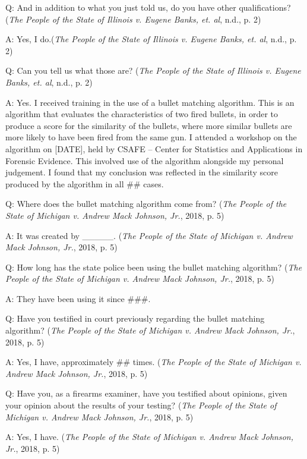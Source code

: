 \documentclass[print]{nuthesis}
\begin{document}
Q: And in addition to what you just told us, do you have other qualifications? (\emph{The {People} of the {State} of {Illinois} v. Eugene {Banks}, et. al}, n.d., p. 2)

A: Yes, I do.(\emph{The {People} of the {State} of {Illinois} v. Eugene {Banks}, et. al}, n.d., p. 2)

Q: Can you tell us what those are? (\emph{The {People} of the {State} of {Illinois} v. Eugene {Banks}, et. al}, n.d., p. 2)

A: Yes. I received training in the use of a bullet matching algorithm.
This is an algorithm that evaluates the characteristics of two fired bullets, in order to produce a score for the similarity of the bullets, where more similar bullets are more likely to have been fired from the same gun.
I attended a workshop on the algorithm on {[}DATE{]}, held by CSAFE -- Center for Statistics and Applications in Forensic Evidence.
This involved use of the algorithm alongside my personal judgement.
I found that my conclusion was reflected in the similarity score produced by the algorithm in all \#\# cases.

Q: Where does the bullet matching algorithm come from? (\emph{The {People} of the {State} of {Michigan} v. Andrew {Mack} {Johnson}, {Jr.}}, 2018, p. 5)

A: It was created by \_\_\_\_\_. (\emph{The {People} of the {State} of {Michigan} v. Andrew {Mack} {Johnson}, {Jr.}}, 2018, p. 5)

Q: How long has the state police been using the bullet matching algorithm? (\emph{The {People} of the {State} of {Michigan} v. Andrew {Mack} {Johnson}, {Jr.}}, 2018, p. 5)

A: They have been using it since \#\#\#.

Q: Have you testified in court previously regarding the bullet matching algorithm? (\emph{The {People} of the {State} of {Michigan} v. Andrew {Mack} {Johnson}, {Jr.}}, 2018, p. 5)

A: Yes, I have, approximately \#\# times. (\emph{The {People} of the {State} of {Michigan} v. Andrew {Mack} {Johnson}, {Jr.}}, 2018, p. 5)

Q: Have you, as a firearms examiner, have you testified about opinions, given your opinion about the results of your testing? (\emph{The {People} of the {State} of {Michigan} v. Andrew {Mack} {Johnson}, {Jr.}}, 2018, p. 5)

A: Yes, I have. (\emph{The {People} of the {State} of {Michigan} v. Andrew {Mack} {Johnson}, {Jr.}}, 2018, p. 5)
\end{document}
